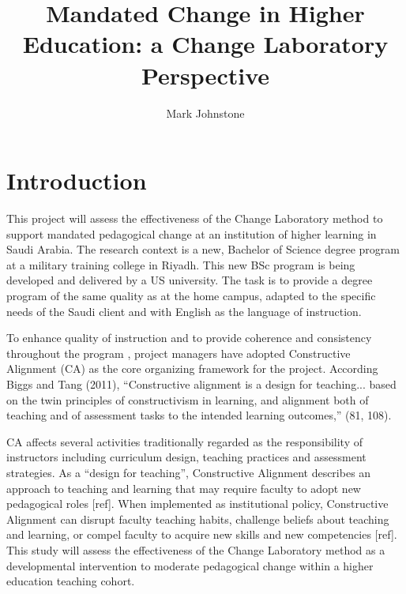 \documentclass[a4paper,man,natbib]{apa6}
\title{Mandated Change in Higher Education: a Change Laboratory Perspective}
\author{Mark Johnstone}
\affiliation{Faculty of Social Sciences, Department of Social Research \\Lancaster University \\October, 2017}
\begin{document}
\maketitle

\section{Introduction}

This project will assess the effectiveness of the Change Laboratory method to support mandated pedagogical change \citep{newcombe1981theory} at an institution of higher learning in Saudi Arabia. The research context is a new, Bachelor of Science degree program at a military training college in Riyadh. This new BSc program is being developed and delivered by a US university. The task is to provide a degree program of the same quality as at the home campus, adapted to the specific needs of the Saudi client and with English as the language of instruction. 

To enhance quality of instruction \citep{masoumi2012quality} and to provide coherence and consistency throughout the program \citep{spelt2015constructively}, project managers have adopted Constructive Alignment (CA) \citep{biggs2011teaching} as the core organizing framework for the project. According Biggs and Tang (2011), ``Constructive alignment is a design for teaching... based on the twin principles of constructivism in learning, and alignment both of teaching and of assessment tasks to the intended learning outcomes,'' (81, 108). 

CA affects several activities traditionally regarded as the responsibility of instructors including curriculum design, teaching practices and assessment strategies. As a ``design for teaching'', Constructive Alignment describes an approach to teaching and learning that may require faculty to adopt new pedagogical roles [ref]. When implemented as institutional policy, Constructive Alignment can disrupt faculty teaching habits, challenge beliefs about teaching and learning, or compel faculty to acquire new skills and new competencies [ref]. This study will assess the effectiveness of the Change Laboratory method as a developmental intervention to moderate pedagogical change within a higher education teaching cohort.
\end{document}
